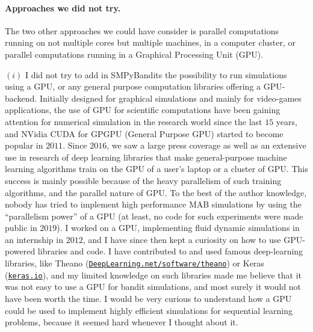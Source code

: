 {

\paragraph{Approaches we did not try.}
%
The two other approaches we could have consider is parallel computations running on not multiple cores but multiple machines, in a computer cluster, or parallel computations running in a Graphical Processing Unit (GPU).

$(i)$ I did not try to add in SMPyBandits the possibility to run simulations using a GPU, or any general purpose computation libraries offering a GPU-backend.
Initially designed for graphical simulations and mainly for video-games applications, the use of GPU for scientific computations have been gaining attention for numerical simulation in the research world since the last $15$ years, and NVidia CUDA for GPGPU (General Purpose GPU) started to become popular in $2011$.
Since $2016$, we saw a large press coverage as well as an extensive use in research of deep learning libraries that make general-purpose machine learning algorithms train on the GPU of a user's laptop or a cluster of GPU.
This success is mainly possible because of the heavy parallelism of such training algorithms, and the parallel nature of GPU.
To the best of the author knowledge, nobody has tried to implement high performance MAB simulations by using the ``parallelism power'' of a GPU (at least, no code for such experiments were made public in $2019$).
I worked on a GPU, implementing fluid dynamic simulations in an internship in $2012$, and I have since then kept a curiosity on how to use GPU-powered libraries and code.
I have contributed to and used famous deep-learning libraries, like Theano (\href{http://deeplearning.net/software/theano/}{\texttt{DeepLearning.net/software/theano}}) or Keras (\href{https://keras.io/}{\texttt{keras.io}}), and my limited knowledge on such libraries made me believe that it was not easy to use a GPU for bandit simulations, and most surely it would not have been worth the time.
I would be very curious to understand how a GPU could be used to implement highly efficient simulations for sequential learning problems, because it seemed hard whenever I thought about it.

}
